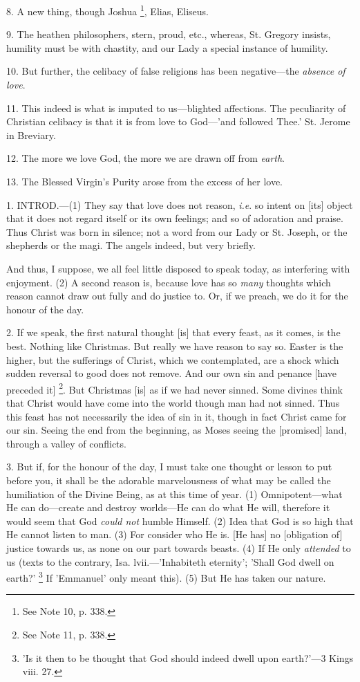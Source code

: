8. A new thing, though Joshua \footnote{See Note
10, p. 338.}, Elias, Eliseus.

9. The heathen philosophers, stern, proud, etc.,
whereas, St. Gregory insists, humility must be with chastity, and our
Lady a special instance of humility.

10. But further, the celibacy of false religions
has been negative—the \emph{absence of love}.

11. This indeed is what is imputed to
us—blighted affections. The peculiarity of Christian celibacy is
that it is from love to God—'and followed Thee.' St. Jerome in
Breviary.

12. The more we love God, the more we are drawn
off from \emph{earth}.

13. The Blessed Virgin's Purity arose from the
excess of her love.


1. INTROD.—(1)
They say that love does not reason, \emph{i.e}. so intent on [its]
object that it does not regard itself or its own feelings; and so of
adoration and praise. Thus Christ was born in silence; not a word from
our Lady or St. Joseph, or the shepherds or the magi. The angels
indeed, but very briefly.

And thus, I suppose, we all feel little disposed
to speak today, as interfering with enjoyment. (2) A second reason is,
because love has so \emph{many} thoughts which reason cannot draw out
fully and do justice to. Or, if we preach, we do it for the honour of
the day.

2. If we speak, the first natural thought [is]
that every feast, as it comes, is the best. Nothing like Christmas.
But really we have reason to say so. Easter is the higher, but the
sufferings of Christ, which we contemplated, are a shock which sudden
reversal to good does not remove. And our own sin and penance [have
preceded it] \footnote{See Note
11, p. 338.}. But
Christmas [is] as if we had never sinned. Some divines think that
Christ would have come into the world though man had not sinned. Thus
this feast has not necessarily the idea of sin in it, though in fact
Christ came for our sin. Seeing the end from the beginning, as
Moses seeing the [promised] land, through a valley of conflicts.

3. But if, for the honour of the day, I must take
one thought or lesson to put before you, it shall be the adorable
marvelousness of what may be called the humiliation of the Divine
Being, as at this time of year. (1) Omnipotent—what He can
do—create and destroy worlds—He can do what He will, therefore it
would seem that God \emph{could not} humble Himself. (2) Idea that God
is so high that He cannot listen to man. (3) For consider who He is.
[He has] no [obligation of] justice towards us, as none on our part
towards beasts. (4) If He only \emph{attended} to us (texts to the
contrary, Isa. lvii.—'Inhabiteth eternity'; 'Shall God dwell on
earth?' \footnote{'Is it then to be
thought that God should indeed dwell upon earth?'—3 Kings viii. 27.} If 'Emmanuel'
only meant this). (5) But He has taken our nature.

